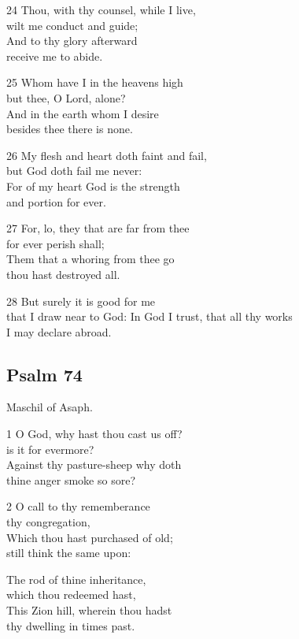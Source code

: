 24 Thou, with thy counsel, while I live,\\
wilt me conduct and guide;\\
And to thy glory afterward\\
receive me to abide.

25 Whom have I in the heavens high\\
but thee, O Lord, alone?\\
And in the earth whom I desire\\
besides thee there is none.

26 My flesh and heart doth faint and fail,\\
but God doth fail me never:\\
For of my heart God is the strength\\
and portion for ever.

27 For, lo, they that are far from thee\\
for ever perish shall;\\
Them that a whoring from thee go\\
thou hast destroyed all.

28 But surely it is good for me\\
that I draw near to God:
In God I trust, that all thy works\\
I may declare abroad.

\begin{center}
\quad{}\quad{}
\end{center}

\subsection*{Psalm 74}

Maschil of Asaph.

1 O God, why hast thou cast us off?\\
is it for evermore?\\
Against thy pasture-sheep why doth\\
thine anger smoke so sore?

2 O call to thy rememberance\\
thy congregation,\\
Which thou hast purchased of old;\\
still think the same upon:

The rod of thine inheritance,\\
which thou redeemed hast,\\
This Zion hill, wherein thou hadst\\
thy dwelling in times past.

